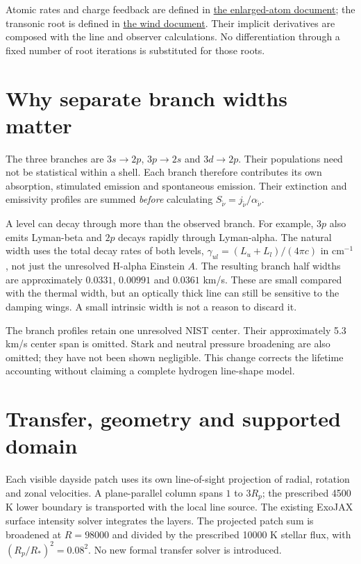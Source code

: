 \documentclass[10pt,a4paper]{article}
\begin{document}
Atomic rates and charge feedback are defined in
\href{atom_convergence.pdf}{the enlarged-atom document}; the transonic root is
defined in \href{parker_wind.pdf}{the wind document}. Their implicit derivatives
are composed with the line and observer calculations. No differentiation
through a fixed number of root iterations is substituted for those roots.

\section{Why separate branch widths matter}
The three branches are $3s\to2p$, $3p\to2s$ and $3d\to2p$.
Their populations need not be statistical within a shell. Each branch therefore
contributes its own absorption, stimulated emission and spontaneous emission.
Their extinction and emissivity profiles are summed \emph{before} calculating
$S_{\widetilde\nu}=j_{\widetilde\nu}/\alpha_{\widetilde\nu}$.

A level can decay through more than the observed branch. For example, $3p$
also emits Lyman-beta and $2p$ decays rapidly through Lyman-alpha. The natural
width uses the total decay rates of both levels,
$\gamma_{ul}=(L_u+L_l)/(4\pi c)$ in cm$^{-1}$, not just the unresolved H-alpha
Einstein $A$. The resulting branch half widths are approximately
$0.0331$, $0.00991$ and $0.0361$ km/s. These are small compared with the
thermal width, but an optically thick line can still be sensitive to the
damping wings. A small intrinsic width is not a reason to discard it.

The branch profiles retain one unresolved NIST center. Their approximately
5.3 km/s center span is omitted. Stark and neutral pressure broadening are also
omitted; they have not been shown negligible. This change corrects the lifetime
accounting without claiming a complete hydrogen line-shape model.

\section{Transfer, geometry and supported domain}
Each visible dayside patch uses its own line-of-sight projection of radial,
rotation and zonal velocities. A plane-parallel column spans $1$ to $3R_p$;
the prescribed 4500 K lower boundary is transported with the local line source.
The existing ExoJAX surface intensity solver integrates the layers. The projected
patch sum is broadened at $R=98000$ and divided by the prescribed 10000 K stellar
flux, with $(R_p/R_*)^2=0.08^2$. No new formal transfer solver is introduced.
\end{document}
